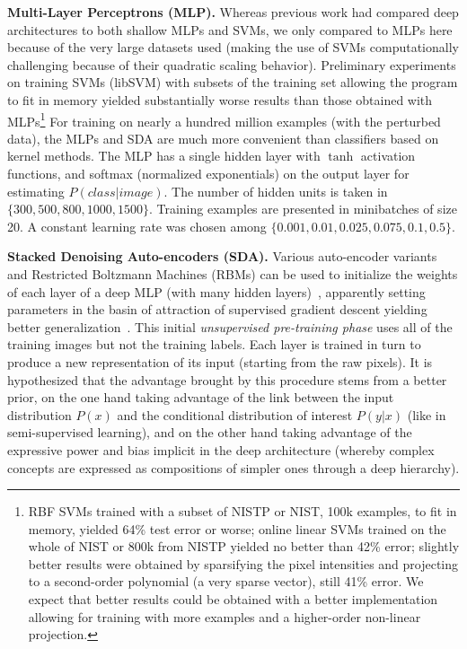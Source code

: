 \documentclass{article} %
\begin{document}
{\bf Multi-Layer Perceptrons (MLP).}  Whereas previous work had compared
deep architectures to both shallow MLPs and SVMs, we only compared to MLPs
here because of the very large datasets used (making the use of SVMs
computationally challenging because of their quadratic scaling
behavior). Preliminary experiments on training SVMs (libSVM) with subsets
of the training set allowing the program to fit in memory yielded
substantially worse results than those obtained with MLPs\footnote{RBF SVMs
  trained with a subset of NISTP or NIST, 100k examples, to fit in memory,
  yielded 64\% test error or worse; online linear SVMs trained on the whole
  of NIST or 800k from NISTP yielded no better than 42\% error; slightly
  better results were obtained by sparsifying the pixel intensities and
  projecting to a second-order polynomial (a very sparse vector), still
  41\% error. We expect that better results could be obtained with a
  better implementation allowing for training with more examples and
  a higher-order non-linear projection.}  For training on nearly a hundred million examples (with the
perturbed data), the MLPs and SDA are much more convenient than classifiers
based on kernel methods.  The MLP has a single hidden layer with $\tanh$
activation functions, and softmax (normalized exponentials) on the output
layer for estimating $P(class | image)$.  The number of hidden units is
taken in $\{300,500,800,1000,1500\}$.  Training examples are presented in
minibatches of size 20. A constant learning rate was chosen among $\{0.001,
0.01, 0.025, 0.075, 0.1, 0.5\}$.


{\bf Stacked Denoising Auto-encoders (SDA).}
Various auto-encoder variants and Restricted Boltzmann Machines (RBMs)
can be used to initialize the weights of each layer of a deep MLP (with many hidden 
layers)~\citep{Hinton06,ranzato-07-small,Bengio-nips-2006}, 
apparently setting parameters in the
basin of attraction of supervised gradient descent yielding better 
generalization~\citep{Erhan+al-2010}.  This initial {\em unsupervised
pre-training phase} uses all of the training images but not the training labels.
Each layer is trained in turn to produce a new representation of its input
(starting from the raw pixels).
It is hypothesized that the
advantage brought by this procedure stems from a better prior,
on the one hand taking advantage of the link between the input
distribution $P(x)$ and the conditional distribution of interest
$P(y|x)$ (like in semi-supervised learning), and on the other hand
taking advantage of the expressive power and bias implicit in the
deep architecture (whereby complex concepts are expressed as
compositions of simpler ones through a deep hierarchy).
\end{document}
